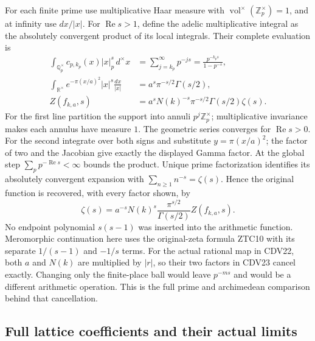 \documentclass[11pt,a4paper]{article}
\theoremstyle{definition}\newtheorem{definition}[theorem]{Definition}
\begin{document}
For each finite prime use multiplicative Haar measure with
$\operatorname{vol}^{\times}(\mathbb Z_p^\times)=1$, and at
infinity use $dx/|x|$. For $\operatorname{Re}s>1$, define the
adelic multiplicative integral as the absolutely convergent product
of its local integrals. Their complete evaluation is
\begin{equation}\tag{CDV23}
\begin{split}
 \int_{\mathbb Q_p^\times}c_{p,k_p}(x)|x|_p^s\,d^\times x
   &=\sum_{j=k_p}^\infty p^{-js}
     =\frac{p^{-k_ps}}{1-p^{-s}},\\
 \int_{\mathbb R^\times}e^{-\pi(x/a)^2}|x|^s\frac{dx}{|x|}
   &=a^s\pi^{-s/2}\Gamma(s/2),\\
 Z(f_{k,a},s)
   &=a^sN(k)^{-s}\pi^{-s/2}\Gamma(s/2)\zeta(s).
\end{split}
\end{equation}
For the first line partition the support into annuli
$p^j\mathbb Z_p^\times$; multiplicative invariance makes each
annulus have measure $1$. The geometric series converges for
$\operatorname{Re}s>0$. For the second integrate over both signs
and substitute $y=\pi(x/a)^2$; the factor of two and the
Jacobian give exactly the displayed Gamma factor. At the global
step $\sum_pp^{-\operatorname{Re}s}<\infty$ bounds the product.
Unique prime factorization identifies its absolutely convergent
expansion with $\sum_{n\ge1}n^{-s}=\zeta(s)$. Hence the original
function is recovered, with every factor shown, by
\begin{equation}\tag{CDV24}
 \zeta(s)=a^{-s}N(k)^s\frac{\pi^{s/2}}{\Gamma(s/2)}
                         Z(f_{k,a},s).
\end{equation}
No endpoint polynomial $s(s-1)$ was inserted into the arithmetic
function. Meromorphic continuation here uses the original-zeta
formula ZTC10 with its separate $1/(s-1)$ and $-1/s$ terms.
For the actual rational map in CDV22, both $a$ and $N(k)$ are
multiplied by $|r|$, so their two factors in CDV23 cancel exactly.
Changing only the finite-place ball would leave $p^{-ms}$ and
would be a different arithmetic operation. This is the full prime
and archimedean comparison behind that cancellation.

\subsection{Full lattice coefficients and their actual limits}
\end{document}
